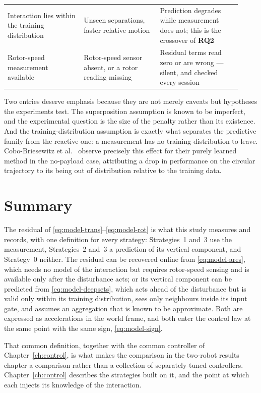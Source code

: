 \begin{table}[t]
\begin{tabular}{@{}p{0.30\linewidth}p{0.30\linewidth}p{0.32\linewidth}@{}}
    Interaction lies within the training distribution
      & Unseen separations, faster relative motion
      & Prediction degrades while measurement does not; this is the crossover of \textbf{RQ2} \\
    Rotor-speed measurement available
      & Rotor-speed sensor absent, or a rotor reading missing
      & Residual terms read zero or are wrong --- silent, and checked every session \\
    \bottomrule
  \end{tabular}
\end{table}

Two entries deserve emphasis because they are not merely caveats but hypotheses the experiments
test. The superposition assumption is known to be imperfect, and the experimental question is the
size of the penalty rather than its existence. And the training-distribution assumption is exactly
what separates the predictive family from the reactive one: a measurement has no training
distribution to leave. Cobo-Briesewitz et al.~\cite{cobobriesewitz2026lindi} observe precisely this
effect for their purely learned method in the no-payload case, attributing a drop in performance on
the circular trajectory to its being out of distribution relative to the training data.

\section{Summary}
\label{sec:model-summary}

The residual of \eqref{eq:model-trans}--\eqref{eq:model-rot} is what this study measures and
records, with one definition for every strategy: Strategies~1 and~3 use the measurement,
Strategies~2 and~3 a prediction of its vertical component, and Strategy~0 neither. The residual can be recovered online from
\eqref{eq:model-ares}, which needs no model of the interaction but requires rotor-speed sensing and
is available only after the disturbance acts; or its vertical component can be predicted from
\eqref{eq:model-deepsets}, which acts ahead of the disturbance but is valid only within its training
distribution, sees only neighbours inside its input gate, and assumes an aggregation that is known
to be approximate. Both are expressed as accelerations in the world frame, and both enter the
control law at the same point with the same sign, \eqref{eq:model-sign}.

That common definition, together with the common controller of Chapter~\ref{ch:control}, is what
makes the comparison in the two-robot results chapter a comparison rather than a collection of
separately-tuned controllers. Chapter~\ref{ch:control}
describes the strategies built on it, and the point at which each injects its knowledge of
the interaction.
